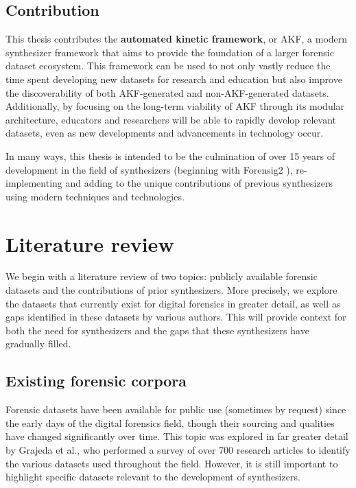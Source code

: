 \documentclass[letterpaper,12pt]{report}
\begin{document}
\section{Contribution}\label{contribution}

This thesis contributes the \textbf{automated kinetic framework}, or
AKF, a modern synthesizer framework that aims to provide the foundation
of a larger forensic dataset ecosystem. This framework can be used to
not only vastly reduce the time spent developing new datasets for
research and education but also improve the discoverability of both
AKF-generated and non-AKF-generated datasets. Additionally, by focusing
on the long-term viability of AKF through its modular architecture,
educators and researchers will be able to rapidly develop relevant
datasets, even as new developments and advancements in technology occur.

In many ways, this thesis is intended to be the culmination of over 15
years of development in the field of synthesizers (beginning with
Forensig2 \cite{mochForensicImageGenerator2009}), re-implementing
and adding to the unique contributions of previous synthesizers using
modern techniques and technologies.

\chapter{Literature review}\label{chapter-two}

We begin with a literature review of two topics: publicly available
forensic datasets and the contributions of prior synthesizers. More
precisely, we explore the datasets that currently exist for digital
forensics in greater detail, as well as gaps identified in these
datasets by various authors. This will provide context for both the need
for synthesizers and the gaps that these synthesizers have gradually
filled.

\section{Existing forensic
corpora}\label{existing-forensic-corpora}

Forensic datasets have been available for public use (sometimes by
request) since the early days of the digital forensics field, though
their sourcing and qualities have changed significantly over time. This
topic was explored in far greater detail by Grajeda et al., who
performed a survey of over 700 research articles to identify the various
datasets used throughout the field. However, it is still important to
highlight specific datasets relevant to the development of synthesizers.
\end{document}
